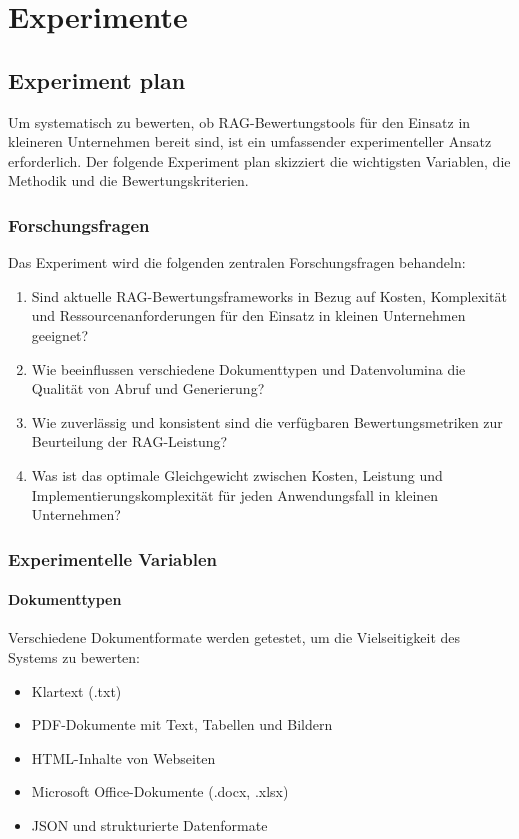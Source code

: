 \chapter{Experimente}

\section{Experiment plan}

Um systematisch zu bewerten, ob RAG-Bewertungstools für den Einsatz in kleineren Unternehmen bereit sind, ist ein umfassender experimenteller Ansatz erforderlich. Der folgende Experiment plan skizziert die wichtigsten Variablen, die Methodik und die Bewertungskriterien.

\subsection{Forschungsfragen}

Das Experiment wird die folgenden zentralen Forschungsfragen behandeln:

\begin{enumerate}
    \item Sind aktuelle RAG-Bewertungsframeworks in Bezug auf Kosten, Komplexität und Ressourcenanforderungen für den Einsatz in kleinen Unternehmen geeignet?
    \item Wie beeinflussen verschiedene Dokumenttypen und Datenvolumina die Qualität von Abruf und Generierung?
    \item Wie zuverlässig und konsistent sind die verfügbaren Bewertungsmetriken zur Beurteilung der RAG-Leistung?
    \item Was ist das optimale Gleichgewicht zwischen Kosten, Leistung und Implementierungskomplexität für jeden Anwendungsfall in kleinen Unternehmen?
\end{enumerate}

\subsection{Experimentelle Variablen}

\subsubsection{Dokumenttypen}
Verschiedene Dokumentformate werden getestet, um die Vielseitigkeit des Systems zu bewerten:
\begin{itemize}
    \item Klartext (.txt)
    \item PDF-Dokumente mit Text, Tabellen und Bildern
    \item HTML-Inhalte von Webseiten
    \item Microsoft Office-Dokumente (.docx, .xlsx)
    \item JSON und strukturierte Datenformate
\end{itemize}

